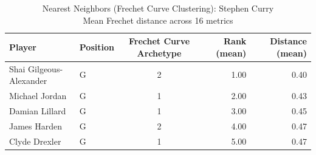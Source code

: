 \begin{table}[t]
\caption*{
{\fontsize{20}{25} Nearest Neighbors (Frechet Curve Clustering): Stephen Curry\fontsize{12}{15}\selectfont } \\ 
{\fontsize{14}{17}\selectfont  Mean Frechet distance across 16 metrics\fontsize{12}{15}\selectfont }
} 
\fontsize{12.0pt}{14.0pt}\selectfont
\begin{tabular*}{\linewidth}{@{\extracolsep{\fill}}llcrr}
\toprule
Player & Position & Frechet Curve Archetype & Rank (mean) & Distance (mean) \\ 
\midrule\addlinespace[2.5pt]
Shai Gilgeous-Alexander & G & 2 & 1.00 & 0.40 \\ 
Michael Jordan & G & 1 & 2.00 & 0.43 \\ 
Damian Lillard & G & 1 & 3.00 & 0.45 \\ 
James Harden & G & 2 & 4.00 & 0.47 \\ 
Clyde Drexler & G & 1 & 5.00 & 0.47 \\ 
\bottomrule
\end{tabular*}
\end{table}


